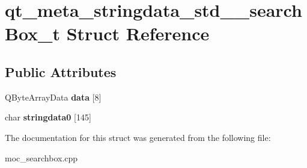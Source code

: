\hypertarget{structqt__meta__stringdata__std____searchBox__t}{}\section{qt\+\_\+meta\+\_\+stringdata\+\_\+std\+\_\+\+\_\+search\+Box\+\_\+t Struct Reference}
\label{structqt__meta__stringdata__std____searchBox__t}
\subsection*{Public Attributes}
\begin{DoxyCompactItemize}
\item 
\mbox{\label{structqt__meta__stringdata__std____searchBox__t_a348b65efb582b9ff8702c9b61381ad12}} 
Q\+Byte\+Array\+Data {\bfseries data} \mbox{[}8\mbox{]}
\item 
\mbox{\label{structqt__meta__stringdata__std____searchBox__t_abc1fc28656b1b0b139eaea2bd4e25344}} 
char {\bfseries stringdata0} \mbox{[}145\mbox{]}
\end{DoxyCompactItemize}


The documentation for this struct was generated from the following file\+:\begin{DoxyCompactItemize}
\item 
moc\+\_\+searchbox.\+cpp\end{DoxyCompactItemize}
